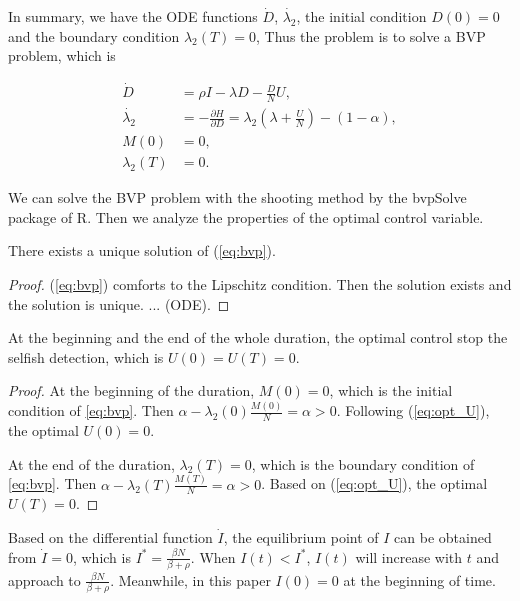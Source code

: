 In summary, we have the ODE functions $\dot{D}$, $\dot{\lambda_{2}}$,
the initial condition $D(0)=0$ and the boundary condition $\lambda_{2}(T)=0$,
Thus the problem is to solve a BVP problem,
which is
\begin{small}
\begin{equation}
\label{eq:bvp}
\begin{aligned}
\dot{D} &= \rho I  - \lambda D - \frac{D}{N} U,\\
\dot{\lambda_{2}} &= - \frac{ \partial H}{ \partial D} = \lambda_{2} (\lambda + \frac{U}{N} ) - (1-\alpha),\\
M(0) &= 0,\\
\lambda_{2}(T) &= 0.
\end{aligned}
\end{equation}
\end{small}
We can solve the BVP problem with the shooting method by the bvpSolve package of R.
Then we analyze the properties of the optimal control variable.
\begin{lem}
There exists a unique solution of (\ref{eq:bvp}).
\end{lem}
\begin{proof}
(\ref{eq:bvp}) comforts to the Lipschitz condition.
Then the solution exists and the solution is unique. ... (ODE).
\end{proof}

\begin{lem}At the beginning and the end of the whole duration,
the optimal control stop the selfish detection,
which is $U(0)=U(T)=0$.
\end{lem}

\begin{proof}
At the beginning of the duration, $M(0)=0$,
which is the initial condition of \ref{eq:bvp}.
Then $\alpha - \lambda_{2}(0) \frac{M(0)}{N} = \alpha > 0$.
Following (\ref{eq:opt_U}), the optimal $U(0)=0$.

At the end of the duration, $\lambda_{2}(T)=0$,
which is the boundary condition of \ref{eq:bvp}.
Then $\alpha - \lambda_{2}(T) \frac{M(T)}{N} = \alpha > 0$.
Based on (\ref{eq:opt_U}), the optimal $U(T)=0$.
\end{proof}

Based on the differential function $\dot{I}$,
the equilibrium point of $I$ can be obtained from $\dot{I}=0$,
which is $I^{*}=\frac{\beta N}{\beta+\rho}$.
When $I(t)<I^{*}$, $I(t)$ will increase with $t$ and approach to $\frac{\beta N}{\beta+\rho}$.
Meanwhile, in this paper $I(0)=0$ at the beginning of time.

